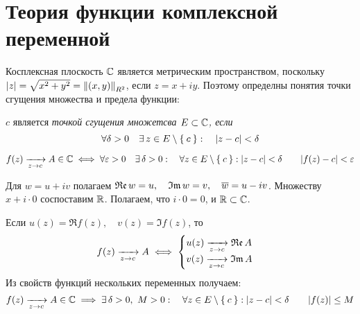 \chapter{Теория функции комплексной переменной}

Косплексная плоскость $ \mathbb{C} $ является метрическим пространством, поскольку $ |z| = \sqrt{x^2 + y^2} = \left\|{(x, y)}\right\|_{R^2} $, если $ z = x + i y $. Поэтому определны понятия точки сгущения множества и предела функции:

\begin{definition}
	$ c $ является \it{точкой сгущения} множетсва $ E \subset \mathbb{C} $, если
	$$ \forall \delta > 0 \quad \exists\, z \in E \setminus \Set{c} : \quad |z - c| < \delta $$
\end{definition}

\begin{definition}
	$$ f(z) \xrightarrow[z \to c]{} A \in \mathbb{C} \iff \forall \varepsilon > 0 \quad \exists\, \delta > 0 : \quad \forall z \in E \setminus \Set{c} : |z - c| < \delta \qquad |f(z) - c| < \varepsilon $$
\end{definition}

Для $ w = u + iv $ полагаем $ \mathfrak{Re}\, w = u, \quad \mathfrak{Im}\, w = v, \quad \overline w = u - iv $. Множеству $ x + i \cdot 0 $ соспоставим $ \mathbb{R} $. Полагаем, что $ i \cdot 0 = 0 $, и $ \mathbb{R} \subset \mathbb{C} $.

\begin{statement}
	Если $ u(z) = \Re f(z), \quad v(z) = \Im f(z) $, то
	$$ f(z) \xrightarrow[z \to c]{} A \iff
	\begin{cases}
		u(z) \xrightarrow[z \to c]{} \mathfrak{Re}\, A \\
		v(z) \xrightarrow[z \to c]{} \mathfrak{Im}\, A
	\end{cases} $$
	Из свойств функций нескольких переменных получаем:
	$$ f(z) \xrightarrow[z \to c]{} A \in \mathbb{C} \implies \exists\, \delta > 0, ~ M > 0 : \quad \forall z \in E \setminus \Set{c} : |z - c| < \delta \qquad |f(z)| \le M $$
\end{statement}
